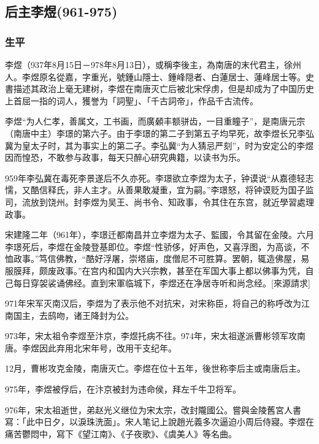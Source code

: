 
\subsection{后主李煜\tiny(961-975)}

\subsubsection{生平}

李煜（937年8月15日－978年8月13日），或稱李後主，為南唐的末代君主，徐州人。李煜原名從嘉，字重光，號鍾山隱士、鍾峰隠者、白蓮居士、蓮峰居士等。史書描述其政治上毫无建树，李煜在南唐灭亡后被北宋俘虏，但是却成为了中国历史上首屈一指的词人，獲誉为「詞聖」、「千古詞帝」，作品千古流传。

李煜“为人仁孝，善属文，工书画，而廣顙丰额骈齿，一目重瞳子”，是南唐元宗（南唐中主）李璟的第六子。由于李璟的第二子到第五子均早死，故李煜长兄李弘冀为皇太子时，其为事实上的第二子。李弘冀“为人猜忌严刻”，时为安定公的李煜因而惶恐，不敢参与政事，每天只醉心研究典籍，以读书为乐。

959年李弘冀在毒死李景遂后不久亦死。李璟欲立李煜为太子，钟谟说“从嘉德轻志懦，又酷信释氏，非人主才。从善果敢凝重，宜为嗣。”李璟怒，将钟谟贬为国子监司，流放到饶州。封李煜为吴王、尚书令、知政事，令其住在东宫，就近學習處理政事。

宋建隆二年（961年），李璟迁都南昌并立李煜为太子、監國，令其留在金陵。六月李璟死后，李煜在金陵登基即位。李煜“性骄侈，好声色，又喜浮图，为高谈，不恤政事。”笃信佛教，“酷好浮屠，崇塔庙，度僧尼不可胜算。罢朝，辄造佛屋，易服膜拜，颇废政事。”在宫内和国内大兴宗教，甚至在军国大事上都以佛事为凭，自己每日穿袈裟诵佛经。直到宋軍临城下，李煜还在净居寺听和尚念经。[來源請求]

971年宋军灭南汉后，李煜为了表示他不对抗宋，对宋称臣，将自己的称呼改为江南国主，去鸱吻，诸王降封为公。

973年，宋太祖令李煜至汴京，李煜托病不往。974年，宋太祖遂派曹彬领军攻南唐。李煜因此弃用北宋年号，改用干支纪年。

12月，曹彬攻克金陵，南唐灭亡。李煜在位十五年，後世称李后主或南唐后主。

975年，李煜被俘后，在汴京被封为违命侯，拜左千牛卫将军。

976年，宋太祖逝世，弟赵光义继位为宋太宗，改封隴國公。嘗與金陵舊宮人書寫：「此中日夕，以淚珠洗面」。宋人笔记上說趙光義多次逼迫小周后侍寢。李煜在痛苦鬱悶中，寫下《望江南》、《子夜歌》、《虞美人》等名曲。

